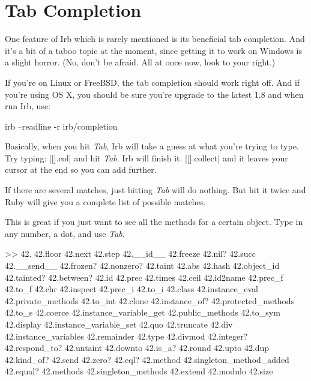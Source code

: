 \documentclass[12pt,twoside]{report}
\begin{document}
\section{Tab Completion}

One feature of Irb which is rarely mentioned is its beneficial tab
completion. And it's a bit of a taboo topic at the moment, since
getting it to work on Windows is a slight horror. (No, don't be
afraid. All at once now, look to your right.)

If you're on Linux or FreeBSD, the tab completion should work right
off. And if you're using OS X, you should be sure you're upgrade to
the latest 1.8 and when run Irb, use:

\begin{consolecode}
 irb --readline -r irb/completion
\end{consolecode}

Basically, when you hit \emph{Tab}, Irb will take a guess at what you're
trying to type. Try typing: \consoleinline|[].col| and hit \emph{Tab}. Irb will finish
it. \consoleinline|[].collect| and it leaves your cursor at the end so you can add
further.

If there are several matches, just hitting \emph{Tab} will do nothing. But
hit it twice and Ruby will give you a complete list of possible
matches.

This is great if you just want to see all the methods for a certain
object. Type in any number, a dot, and use \emph{Tab}.

\begin{consolecode}
  >> 42.
                42.floor                   42.next                    42.step
  42.__id__     42.freeze                  42.nil?                    42.succ
  42.__send__   42.frozen?                 42.nonzero?                42.taint
  42.abs        42.hash                    42.object_id               42.tainted?
  42.between?   42.id                      42.prec                    42.times
  42.ceil       42.id2name                 42.prec_f                  42.to_f
  42.chr        42.inspect                 42.prec_i                  42.to_i
  42.class      42.instance_eval           42.private_methods         42.to_int
  42.clone      42.instance_of?            42.protected_methods       42.to_s
  42.coerce     42.instance_variable_get   42.public_methods          42.to_sym
  42.display    42.instance_variable_set   42.quo                     42.truncate
  42.div        42.instance_variables      42.remainder               42.type
  42.divmod     42.integer?                42.respond_to?             42.untaint
  42.downto     42.is_a?                   42.round                   42.upto
  42.dup        42.kind_of?                42.send                    42.zero?
  42.eql?       42.method                  42.singleton_method_added  
  42.equal?     42.methods                 42.singleton_methods       
  42.extend     42.modulo                  42.size  
\end{consolecode}
\end{document}
